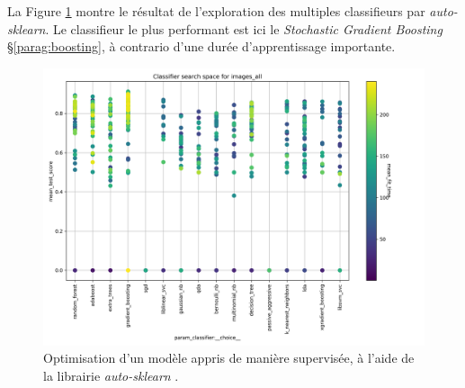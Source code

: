 La Figure \ref{fig:autosk_result} montre le résultat de l'exploration des multiples classifieurs par \textit{auto-sklearn}.
Le classifieur le plus performant est ici le \textit{Stochastic Gradient Boosting} §\ref{parag:boosting}, à contrario d'une durée d'apprentissage importante.

\begin{figure}[hbtp]
    \centering
    \includegraphics[width=\textwidth,height=\textheight,keepaspectratio]{../Chap4/Figures/cv_results_images_all.png}
    \caption{Optimisation d'un modèle appris de manière supervisée, à l'aide de la librairie \textit{auto-sklearn} \cite{feurer_efficient_2015}.}
    \label{fig:autosk_result}
\end{figure}


